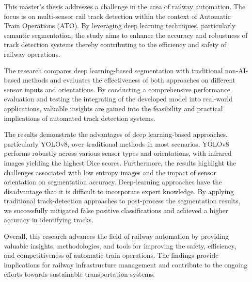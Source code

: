 \documentclass[Master,MDS,english]{BASE/twbook} %
\begin{document}
This master's thesis addresses a challenge in the area of railway automation. The focus is on multi-sensor rail track detection within the context of Automatic Train Operations (ATO). By leveraging deep learning techniques, particularly semantic segmentation, the study aims to enhance the accuracy and robustness of track detection systems thereby contributing to the efficiency and safety of railway operations.

The research compares deep learning-based segmentation with traditional non-AI-based methods and evaluates the effectiveness of both approaches on different sensor inputs and orientations. By conducting a comprehensive performance evaluation and testing the integrating of the developed model into real-world applications, valuable insights are gained into the feasibility and practical implications of automated track detection systems.

The results demonstrate the advantages of deep learning-based approaches, particularly YOLOv8, over traditional methods in most scenarios. YOLOv8 performs robustly across various sensor types and orientations, with infrared images yielding the highest Dice scores. Furthermore, the results highlight the challenges associated with low entropy images and the impact of sensor orientation on segmentation accuracy. 
Deep-learning approaches have the disadvantage that it is difficult to incorporate expert knowledge. By applying traditional track-detection approaches to post-process the segmentation results, we successfully mitigated false positive classifications and achieved a higher accuracy in identifying tracks.

Overall, this research advances the field of railway automation by providing valuable insights, methodologies, and tools for improving the safety, efficiency, and competitiveness of automatic train operations. The findings provide implications for railway infrastructure management and contribute to the ongoing efforts towards sustainable transportation systems.
\end{document}
